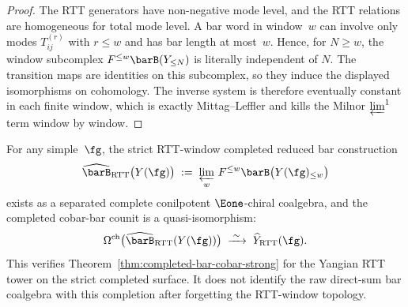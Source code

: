 \begin{proof}
The RTT generators have non-negative mode level, and the RTT
relations are homogeneous for total mode level. A bar word in
window~$w$ can involve only modes $T_{ij}^{(r)}$ with $r\leq w$ and
has bar length at most~$w$. Hence, for $N\geq w$, the window
subcomplex $F^{\leq w}\barB(Y_{\leq N})$ is literally independent of
$N$. The transition maps are identities on this subcomplex, so they
induce the displayed isomorphisms on cohomology. The inverse system is
therefore eventually constant in each finite window, which is exactly
Mittag--Leffler and kills the Milnor $\varprojlim^1$ term window by
window.
\end{proof}

\begin{corollary}
\label{cor:completed-bar-cobar-yangian}
For any simple~$\fg$, the strict RTT-window completed reduced bar
construction
\[
\widehat{\barB}_{\mathrm{RTT}}\bigl(Y(\fg)\bigr)
\;:=\;
\varprojlim_w\,F^{\leq w}\barB\bigl(Y(\fg)_{\leq w}\bigr)
\]
exists as a separated complete conilpotent $\Eone$-chiral coalgebra,
and the completed cobar-bar counit is a quasi-isomorphism:
\[
\Omega^{\mathrm{ch}}\bigl(
 \widehat{\barB}_{\mathrm{RTT}}(Y(\fg))
\bigr)
\;\xrightarrow{\;\sim\;}\;
\widehat Y_{\mathrm{RTT}}(\fg).
\]
This verifies
Theorem~\textup{\ref{thm:completed-bar-cobar-strong}}
for the Yangian RTT tower on the strict completed surface. It does not
identify the raw direct-sum bar coalgebra with this completion after
forgetting the RTT-window topology.
\end{corollary}

